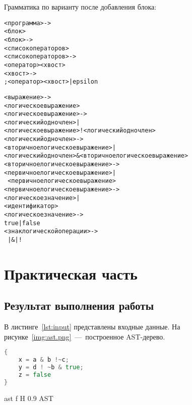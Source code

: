 Грамматика по варианту после добавления блока:



\begin{framed}
	\ttfamily 
	\begin{alltt}
<программа> -> 
    <блок>
<блок> -> 
    { <список операторов> }
<список операторов> ->
    <оператор> < хвост>
<хвост> ->
    ; <оператор> <хвост> | epsilon


<выражение> ->
    <логическое выражение>
<логическое выражение> ->
    <логический одночлен> | 
    <логическое выражение> ! <логический одночлен>
<логический одночлен> ->
    <вторичное логическое выражение> | 
    <логический одночлен> \& <вторичное логическое выражение>
<вторичное логическое выражение> ->
    <первичное логическое выражение> |
    ~ <первичное логическое выражение>
<первичное логическое выражение> ->
    <логическое значение> |
    <идентификатор>
<логическое значение> ->
    true | false
<знак логической операции> ->
    ~ | & | !
\end{alltt}
\end{framed} 

\chapter{Практическая часть}


\section{Результат выполнения работы}

В листинге~\ref{lst:input} представлены входные данные. На рисунке~\ref{img:ast.png}~---~построенное AST-дерево.

\begin{lstlisting}[language=Go, caption={Входная программа}, label=lst:input]
{
	x = a & b !~c;
	y = d ! ~b & true;
	z = false
}
\end{lstlisting}

{ast}
{f} 
{H}
{0.9\textwidth}
{AST} 
